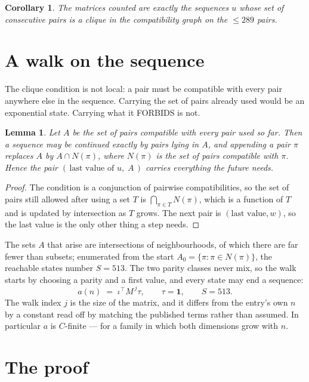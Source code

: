 \documentclass[11pt,a4paper]{article}
\theoremstyle{plain}
\newtheorem{lemma}[theorem]{Lemma}
\newtheorem{corollary}[theorem]{Corollary}
\theoremstyle{definition}
\begin{document}
\begin{corollary}
The matrices counted are exactly the sequences $u$ whose set of consecutive pairs is a clique in
the compatibility graph on the $\le 289$ pairs.
\end{corollary}

\section{A walk on the sequence}

The clique condition is not local: a pair must be compatible with every pair anywhere else in
the sequence. Carrying the set of pairs already used would be an exponential state. Carrying
what it FORBIDS is not.

\begin{lemma}\label{lem:lump}
Let $A$ be the set of pairs compatible with every pair used so far. Then a sequence may be
continued exactly by pairs lying in $A$, and appending a pair $\pi$ replaces $A$ by
$A\cap N(\pi)$, where $N(\pi)$ is the set of pairs compatible with $\pi$. Hence the pair
$(\,\text{last value of }u,\;A\,)$ carries everything the future needs.
\end{lemma}

\begin{proof}
The condition is a conjunction of pairwise compatibilities, so the set of pairs still allowed
after using a set $T$ is $\bigcap_{\pi\in T}N(\pi)$, which is a function of $T$ and is updated
by intersection as $T$ grows. The next pair is $(\text{last value},w)$, so the last value is
the only other thing a step needs.
\end{proof}

The sets $A$ that arise are intersections of neighbourhoods, of which there are far fewer than
subsets; enumerated from the start $A_0=\{\pi:\pi\in N(\pi)\}$, the reachable states number
$S=513$. The two parity classes never mix, so the walk starts by choosing a parity and a first
value, and every state may end a sequence:
\[
a(n)\;=\;\iota^{\!\top}M^{\,j}\tau ,\qquad \tau=\mathbf{1},\qquad S=513.
\]
The walk index $j$ is the size of the matrix, and it differs from the entry's own $n$ by a
constant read off by matching the published terms rather than assumed. In particular $a$ is
$C$-finite --- for a family in which both dimensions grow with $n$.

\section{The proof}
\end{document}
